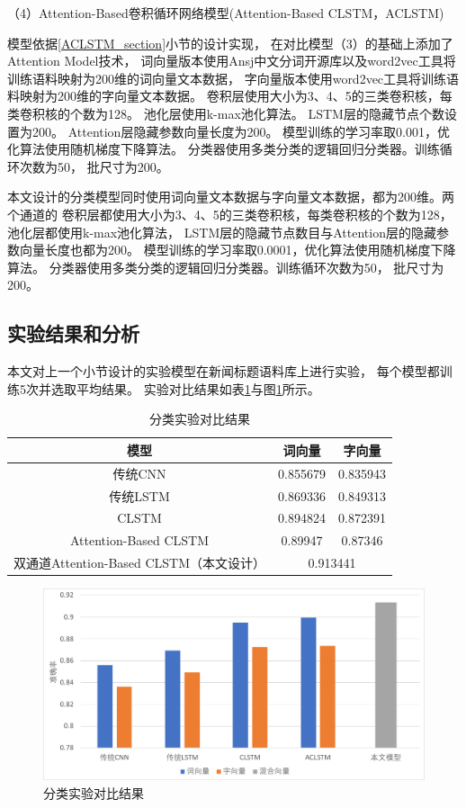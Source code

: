 （4）Attention-Based卷积循环网络模型(Attention-Based CLSTM，ACLSTM)

模型依据\ref{ACLSTM_section}小节的设计实现，
在对比模型（3）的基础上添加了Attention Model技术，
词向量版本使用Ansj中文分词开源库以及word2vec工具将训练语料映射为200维的词向量文本数据，
字向量版本使用word2vec工具将训练语料映射为200维的字向量文本数据。
卷积层使用大小为3、4、5的三类卷积核，每类卷积核的个数为128。
池化层使用k-max池化算法。
LSTM层的隐藏节点个数设置为200。
Attention层隐藏参数向量长度为200。
模型训练的学习率取0.001，优化算法使用随机梯度下降算法。
分类器使用多类分类的逻辑回归分类器。训练循环次数为50，
批尺寸为200。

本文设计的分类模型同时使用词向量文本数据与字向量文本数据，都为200维。两个通道的
卷积层都使用大小为3、4、5的三类卷积核，每类卷积核的个数为128，池化层都使用k-max池化算法，
LSTM层的隐藏节点数目与Attention层的隐藏参数向量长度也都为200。
模型训练的学习率取0.0001，优化算法使用随机梯度下降算法。
分类器使用多类分类的逻辑回归分类器。训练循环次数为50，
批尺寸为200。
\subsection{实验结果和分析}
本文对上一个小节设计的实验模型在新闻标题语料库上进行实验，
每个模型都训练5次并选取平均结果。
实验对比结果如表\ref{classification_result_table}与图\ref{classifcation_pic}所示。
\begin{table}[h]
    \caption{分类实验对比结果}
    \begin{tabular}{|c|c|c|}
        \hline
        模型 & 词向量 & 字向量 \\
        \hline
        传统CNN & 0.855679 & 0.835943 \\
        \hline
        传统LSTM & 0.869336 & 0.849313 \\
        \hline
        CLSTM & 0.894824 & 0.872391 \\
        \hline
        Attention-Based CLSTM & 0.89947 & 0.87346 \\
        \hline
        双通道Attention-Based CLSTM（本文设计） & \multicolumn{2}{|c|}{0.913441} \\
        \hline
    \end{tabular}
    \label{classification_result_table}
\end{table}
\begin{figure}[!h]
    \includegraphics[scale=0.45]{picture/classification.pdf}
    \caption{分类实验对比结果}
    \label{classifcation_pic}
\end{figure}

